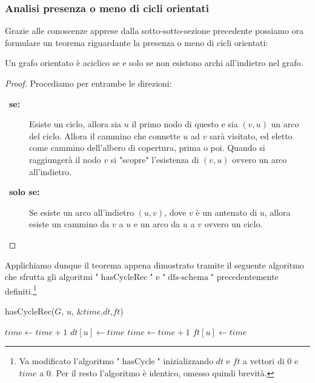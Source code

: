         \subsubsection{Analisi presenza o meno di cicli orientati}
            Grazie alle conoscenze apprese dalla sotto-sotto-sezione precedente possiamo ora formulare un teorema riguardante la presenza o meno di cicli orientati:
            \begin{theorem}
                Un grafo orientato è aciclico se e solo se non esistono archi all'indietro nel grafo.
            \end{theorem}
            \begin{proof} Procediamo per entrambe le direzioni:
                \begin{description}
                    \item[\textbullet\ \textbf{se:}] Esiste un ciclo, allora sia $u$ il primo nodo di questo e sia $(v,u)$ un arco del ciclo. Allora il cammino che connette $u$ ad $v$ sarà visitato, ed eletto come cammino dell'albero di copertura, prima o poi. Quando si raggiungerà il nodo $v$ si "scopre" l'esistenza di $(v,u)$ ovvero un arco all'indietro.
                    \item[\textbullet\ \textbf{solo se:}] Se esiste un arco all'indietro $(u,v)$, dove $v$ è un antenato di $u$, allora esiste un cammino da $v$ a $u$ e un arco da $u$ a $v$ ovvero un ciclo.  
                \end{description}
            \end{proof}
            Applichiamo dunque il teorema appena dimostrato tramite il seguente algoritmo che sfrutta gli algoritmi "$\operatorname{hasCycleRec}$" e "$\operatorname{dfs-schema}$" precedentemente definiti.\footnote{Va modificato l'algoritmo "$\operatorname{hasCycle}$" inizializzando $dt$ e $ft$ a vettori di $0$ e $time$ a $0$. Per il resto l'algoritmo è identico, omesso quindi brevità.}
            \begin{algorithm}[H]
                \caption{\Bool hasCycleRec(\Graph $G$, \Node $u$, \Int $\&time$,\Int[] $dt$,\Int $ft$)}
                \begin{algorithmic}
                    \State $ time \gets time + 1$
                    \State $ dt[u] \gets time $
                                \State \Return \True
                            \EndIf
                            \State \Return \True
                        \EndIf
                    \EndFor
                    \State $ time \gets time + 1$
                    \State $ ft[u] \gets time $
                    \State \Return \False
                \end{algorithmic}
            \end{algorithm}
